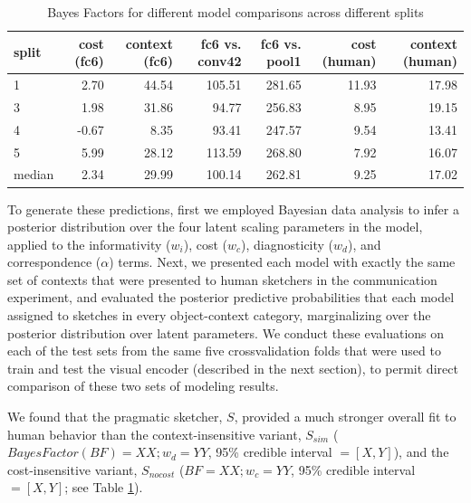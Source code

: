 \documentclass[9pt,twocolumn,twoside]{pnas-new}
\begin{document}
\begin{table}[ht]
\centering
\begin{tabular}{lrrrrrr}
  \hline
split & \multicolumn{1}{p{0.35in}}{\centering cost (fc6)} & \multicolumn{1}{p{0.35in}}{\centering context (fc6)} & \multicolumn{1}{p{0.35in}}{\centering fc6 vs. conv42} & \multicolumn{1}{p{0.35in}}{\centering fc6 vs. pool1} & \multicolumn{1}{p{0.35in}}{\centering cost (human)} & \multicolumn{1}{p{0.35in}}{\centering context (human)} \\ 
  \hline
1 & 2.70 & 44.54 & 105.51 & 281.65 & 11.93 & 17.98 \\ 
  3 & 1.98 & 31.86 & 94.77 & 256.83 & 8.95 & 19.15 \\ 
  4 & -0.67 & 8.35 & 93.41 & 247.57 & 9.54 & 13.41 \\ 
  5 & 5.99 & 28.12 & 113.59 & 268.80 & 7.92 & 16.07 \\ 
  median & 2.34 & 29.99 & 100.14 & 262.81 & 9.25 & 17.02 \\ 
   \hline
\end{tabular}
\caption{Bayes Factors for different model comparisons across different splits}
\label{model_comparison}
\end{table}

To generate these predictions, first we employed Bayesian data analysis to infer a posterior distribution over the four latent scaling parameters in the model, applied to the informativity ($w_{i}$), cost ($w_{c}$), diagnosticity ($w_{d}$), and correspondence ($\alpha$) terms. 
Next, we presented each model with exactly the same set of contexts that were presented to human sketchers in the communication experiment, and evaluated the posterior predictive probabilities that each model assigned to sketches in every object-context category, marginalizing over the posterior distribution over latent parameters. 
We conduct these evaluations on each of the test sets from the same five crossvalidation folds that were used to train and test the visual encoder (described in the next section), to permit direct comparison of these two sets of modeling results. 

We found that the pragmatic sketcher, $S$, provided a much stronger overall fit to human behavior than the context-insensitive variant, $S_{sim}$ ($Bayes Factor (BF) = XX; w_d = YY$, 95\% credible interval $= [X, Y]$), and the cost-insensitive variant, $S_{nocost}$ ($BF = XX; w_c = YY$, 95\% credible interval $=[X, Y]$; see Table \ref{model_comparison}). 
\end{document}
